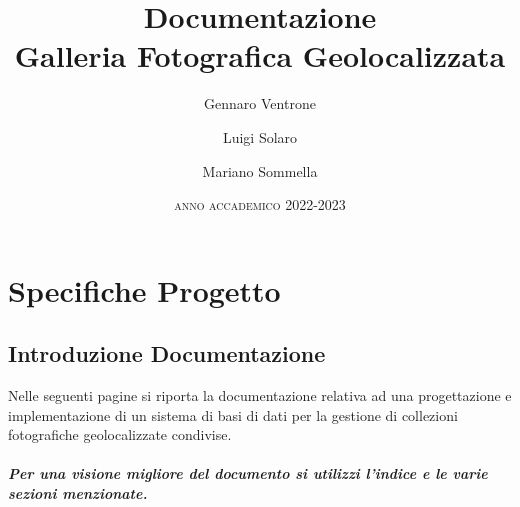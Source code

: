 \documentclass[a4paper,12pt,oneside]{book}
\title{\textrm{Documentazione\\Galleria Fotografica Geolocalizzata}}
\author{Gennaro Ventrone\and Luigi Solaro\and Mariano Sommella}
\date{\textsc{\large anno accademico 2022-2023}}
\begin{document}
       
    \begin{titlepage}
        \maketitle
    \end{titlepage}
    
        \frontmatter
        \tableofcontents
        \mainmatter
        
    \chapter{Specifiche Progetto}
    
    \section{Introduzione Documentazione}
    \par
    Nelle seguenti pagine si riporta la documentazione relativa ad una progettazione e implementazione di un sistema di basi di dati per la gestione di collezioni fotografiche geolocalizzate condivise.\par \paragraph{
    \footnotesize Per una visione migliore del documento si utilizzi l'indice e le varie sezioni menzionate.}
    
\end{document}
